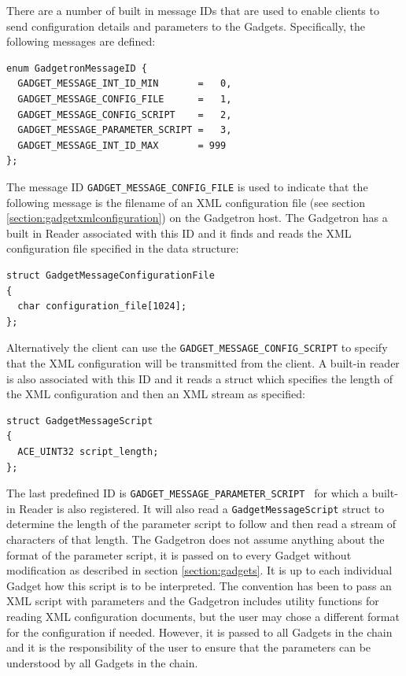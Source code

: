 \documentclass[11pt]{article}
\begin{document}
There are a number of built in message IDs that are used to enable clients to send configuration details and parameters to the Gadgets. Specifically, the following messages are defined:
{\scriptsize 
\begin{verbatim}
enum GadgetronMessageID {
  GADGET_MESSAGE_INT_ID_MIN       =   0,
  GADGET_MESSAGE_CONFIG_FILE      =   1,
  GADGET_MESSAGE_CONFIG_SCRIPT    =   2,
  GADGET_MESSAGE_PARAMETER_SCRIPT =   3,
  GADGET_MESSAGE_INT_ID_MAX       = 999
};
\end{verbatim}}

The message ID \texttt{GADGET\_MESSAGE\_CONFIG\_FILE} is used to indicate that the following message is the filename of an XML configuration file (see section \ref{section:gadgetxmlconfiguration}) on the Gadgetron host. The Gadgetron has a built in Reader associated with this ID and it finds and reads the XML configuration file specified in the data structure: 
{\scriptsize 
\begin{verbatim}
struct GadgetMessageConfigurationFile
{
  char configuration_file[1024];
};
\end{verbatim}}
Alternatively the client can use the \texttt{GADGET\_MESSAGE\_CONFIG\_SCRIPT} to specify that the XML configuration will be transmitted from the client. A built-in reader is also associated with this ID and it reads a struct which specifies the length of the XML configuration and then an XML stream as specified:
{\scriptsize 
\begin{verbatim}
struct GadgetMessageScript
{
  ACE_UINT32 script_length;
};
\end{verbatim}}

The last predefined ID is  \texttt{GADGET\_MESSAGE\_PARAMETER\_SCRIPT } for which a built-in Reader is also registered. It will also read a  \texttt{GadgetMessageScript} struct to determine the length of the parameter script to follow and then read a stream of characters of that length. The Gadgetron does not assume anything about the format of the parameter script, it is passed on to every Gadget without modification as described in section \ref{section:gadgets}. It is up to each individual Gadget how this script is to be interpreted. The convention has been to pass an XML script with parameters and the Gadgetron includes utility functions for reading XML configuration documents, but the user may chose a different format for the configuration if needed. However, it is passed to all Gadgets in the chain and it is the responsibility of the user to ensure that the parameters can be understood by all Gadgets in the chain. 
\end{document}
